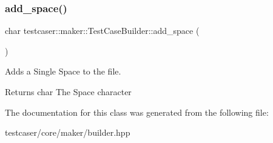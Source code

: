 \subsubsection{\texorpdfstring{add\+\_\+space()}{add\_space()}}
{\footnotesize\ttfamily char testcaser\+::maker\+::\+Test\+Case\+Builder\+::add\+\_\+space (\begin{DoxyParamCaption}{ }\end{DoxyParamCaption})\hspace{0.3cm}{\ttfamily [inline]}}



Adds a Single Space to the file. 

\begin{DoxyReturn}{Returns}
char The Space character 
\end{DoxyReturn}


The documentation for this class was generated from the following file\+:\begin{DoxyCompactItemize}
\item 
testcaser/core/maker/builder.\+hpp\end{DoxyCompactItemize}
